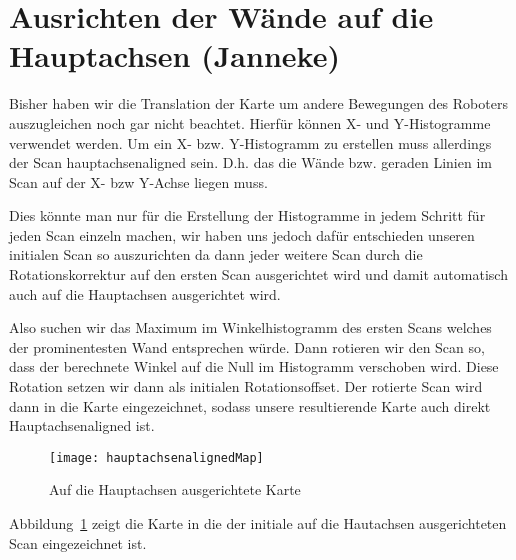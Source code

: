 \section{Ausrichten der Wände auf die Hauptachsen (Janneke)}

Bisher haben wir die Translation der Karte um andere Bewegungen des Roboters auszugleichen noch gar nicht beachtet. Hierfür können X- und Y-Histogramme verwendet werden. Um ein X- bzw. Y-Histogramm zu erstellen muss allerdings der Scan hauptachsenaligned sein. D.h. das die Wände bzw. geraden Linien im Scan auf der X- bzw Y-Achse liegen muss.

Dies könnte man nur für die Erstellung der Histogramme in jedem Schritt für jeden Scan einzeln machen, wir haben uns jedoch dafür entschieden unseren initialen Scan so auszurichten da dann jeder weitere Scan durch die Rotationskorrektur auf den ersten Scan ausgerichtet wird und damit automatisch auch auf die Hauptachsen ausgerichtet wird.

Also suchen wir das Maximum im Winkelhistogramm des ersten Scans welches der prominentesten Wand entsprechen würde. Dann rotieren wir den Scan so, dass der berechnete Winkel auf die Null im Histogramm verschoben wird. Diese Rotation setzen wir dann als initialen Rotationsoffset. Der rotierte Scan wird dann in die Karte eingezeichnet, sodass unsere resultierende Karte auch direkt Hauptachsenaligned ist.

\begin{figure}
	\centering
	\texttt{[image: hauptachsenalignedMap]}
	\caption{Auf die Hauptachsen ausgerichtete Karte}
	\label{fig:Hauptachsenaligned}
\end{figure}

Abbildung~\ref{fig:Hauptachsenaligned} zeigt die Karte in die der initiale auf die Hautachsen ausgerichteten Scan eingezeichnet ist.